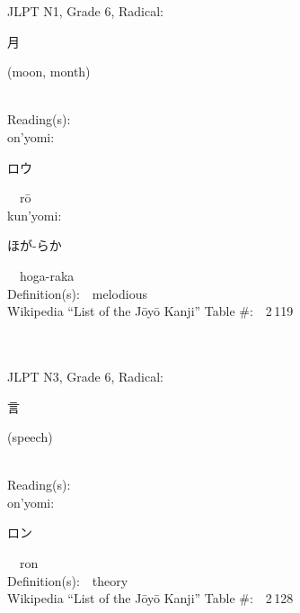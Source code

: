 \begin{multicols}{2}
{JLPT N1, Grade 6, Radical:\ \ {\begin{CJK}{UTF8}{min} 月 \end{CJK}} (moon, month) } \\
Reading(s):\ \ \\
{\hspace*{1em}}on'yomi:\ \ \\
{\hspace*{2em}}{\begin{CJK}{UTF8}{min} ロウ \end{CJK}}\ \ r\=o\ \ \\
{\hspace*{1em}}kun'yomi:\ \ \\
{\hspace*{2em}}{\begin{CJK}{UTF8}{min} ほが-らか \end{CJK}}\ \ hoga-raka\ \ \\
Definition(s):\ \ melodious \\
Wikipedia ``List of the J\=oy\=o Kanji'' Table \#:\ \ 2\,119 \\
\ \ \\
{\fontsize{34pt}{40pt}  }\ \ \\  %
{JLPT N3, Grade 6, Radical:\ \ {\begin{CJK}{UTF8}{min} 言 \end{CJK}} (speech) } \\
Reading(s):\ \ \\
{\hspace*{1em}}on'yomi:\ \ \\
{\hspace*{2em}}{\begin{CJK}{UTF8}{min} ロン \end{CJK}}\ \ ron\ \ \\
Definition(s):\ \ theory \\
Wikipedia ``List of the J\=oy\=o Kanji'' Table \#:\ \ 2\,128 \\
\ \ \\
\end{multicols}

\newpage



